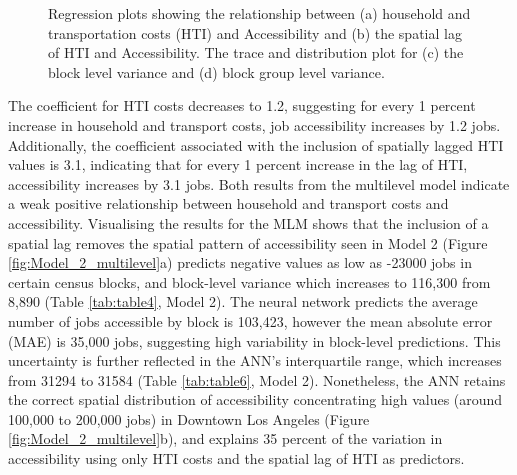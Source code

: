\documentclass[a4paper,UKenglish]{lipics-v2018}
\begin{document}
\begin{figure}[H]
    \centering
    \caption[Model 2 Trace and Posterior plots]{Regression plots showing the relationship between (a) household and transportation costs (HTI) and Accessibility and (b) the spatial lag of HTI and Accessibility. The  trace and distribution plot for (c) the block level variance and (d) block group level variance.} 
    \label{fig:Fit_2_robust}
\end{figure}

The coefficient for HTI costs decreases to 1.2, suggesting for every 1 percent increase in household and transport costs, job accessibility increases by 1.2 jobs. Additionally, the coefficient associated with the inclusion of spatially lagged HTI values is 3.1, indicating that for every 1 percent increase in the lag of HTI, accessibility increases by 3.1 jobs. Both results from the multilevel model indicate a weak positive relationship between household and transport costs and accessibility. Visualising the results for the MLM shows that the inclusion of a spatial lag removes the spatial pattern of accessibility seen in Model 2 (Figure \ref{fig:Model_2_multilevel}a) predicts negative values as low as -23000 jobs in certain census blocks, and block-level variance which increases to 116,300 from 8,890 (Table \ref{tab:table4}, Model 2). The neural network predicts the average number of jobs accessible by block is 103,423, however the mean absolute error (MAE) is 35,000 jobs, suggesting high variability in block-level predictions. This uncertainty is further reflected in the ANN's interquartile range, which increases from 31294 to 31584 (Table \ref{tab:table6}, Model 2). Nonetheless, the ANN retains the correct spatial distribution of accessibility concentrating high values (around 100,000 to 200,000 jobs) in Downtown Los Angeles (Figure \ref{fig:Model_2_multilevel}b), and explains 35 percent of the variation in accessibility using only HTI costs and the spatial lag of HTI as predictors.
\end{document}
